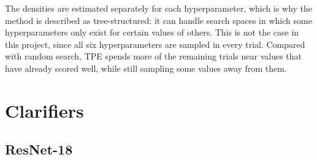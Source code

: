 The densities are estimated separately for each hyperparameter, which is why the method is described as tree-structured: it can handle search spaces in which some hyperparameters only exist for certain values of others. This is not the case in this project, since all six hyperparameters are sampled in every trial. Compared with random search, TPE spends more of the remaining trials near values that have already scored well, while still sampling some values away from them.

\Needspace*{0.6\textheight}
\section{Clarifiers}

\Needspace*{0.6\textheight}
\subsection{ResNet-18}

